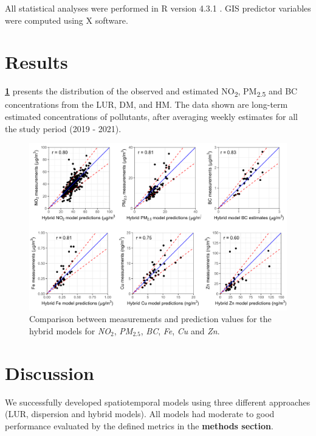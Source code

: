 \documentclass{article}
\begin{document}
All statistical analyses were performed in R version 4.3.1 \cite{Rstudio}. GIS predictor variables were computed using X software. 

\newpage
\section{Results}

\textbf{\cref{fig2}} presents the distribution of the observed and estimated NO\textsubscript{2}, PM\textsubscript{2.5} and BC concentrations from the LUR, DM, and HM. The data shown are long-term estimated concentrations of pollutants, after averaging weekly estimates for all the study period (2019 - 2021).   

\captionsetup[figure]{skip=6pt}
\begin{figure}[!htb]
\includegraphics[width=1.0\textwidth]{figures/fig_HM_test_all_models.png}
\caption{Comparison between measurements and prediction values for the hybrid models for \textit{NO$_2$}, \textit{PM$_{2.5}$}, \textit{BC}, \textit{Fe}, \textit{Cu} and \textit{Zn}.}
\label{fig2}
\end{figure}

\section{Discussion}
We successfully developed spatiotemporal models using three different approaches (LUR, dispersion and hybrid models). All models had moderate to good performance evaluated by the defined metrics in the \textbf{methods section}.
\end{document}

